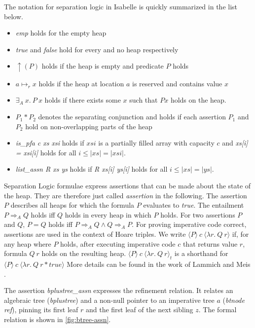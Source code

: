 \documentclass[runningheads]{llncs}
\begin{document}
The notation for separation logic in Isabelle is quickly summarized in the list below.
\begin{itemize}
    \item \textit{emp} holds for the empty heap
    \item \textit{true} and \textit{false} hold for every and no heap respectively
    \item $\uparrow(P)$ holds if the heap is empty and predicate $P$ holds
    \item $a \mapsto_r x$ holds if the heap at location $a$ is reserved and contains
    value $x$
    \item $\exists_A\ x.\ P\ x$ holds if there exists some $x$ such that $P x$
    holds on the heap.
    \item $P_1 * P_2$ denotes the separating conjunction and holds if each assertion $P_1$ and $P_2$ hold on non-overlapping parts
    of the heap
    \item \emph{is\_pfa c xs xsi} holds if $xsi$ is a partially filled array
    with capacity $c$ and \emph{xs[i] = xsi[i]} holds for all $i \leq |xs| = |xsi|$.
    \item \emph{list\_assn R xs ys} holds if \emph{R xs[i] ys[i]} holds for all $i \leq |xs| = |ys|$.
\end{itemize}
Separation Logic formulae express assertions that can be made about the state of the heap.
They are therefore just called \emph{assertion} in the following.
The assertion $P$ describes all heaps for which the formula $P$ evaluates to \emph{true}.
The entailment $P \Longrightarrow_A Q$ holds iff $Q$ holds in every heap in which $P$ holds.
For two assertions $P$ and $Q$, $P = Q$ holds iff $P \Longrightarrow_A Q \wedge Q \Longrightarrow_A P$.
For proving imperative code correct, assertions are used in the context of Hoare triples.
We write $\langle P\rangle\ c\ \langle\lambda r.\ Q\ r\rangle$ if, for any heap where $P$ holds, after executing
imperative code $c$ that returns value $r$, formula $Q\ r$ holds on the resulting heap.
$\langle P\rangle\ c\ \langle\lambda r.\ Q\ r\rangle_t$ is a shorthand for $\langle P\rangle\ c\ \langle\lambda r.\ Q\ r * \mathit{true}\rangle$
More details can be found in the work of Lammich and Meis \cite{DBLP:journals/afp/LammichM12}.

The assertion \emph{bplustree\_assn} expresses the refinement relation.
It relates an algebraic tree (\emph{bplustree})
and a non-null pointer to an imperative tree $a$ (\emph{btnode ref}), pinning its first leaf $r$ and the first leaf of the next sibling $z$.
The formal relation is shown in \cref{fig:btree-assn}.
\end{document}
